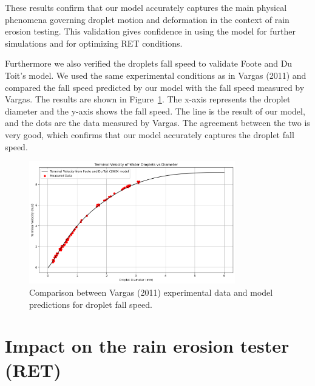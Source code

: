 \documentclass[10pt]{report}
\begin{document}
\par These results confirm that our model accurately captures the main physical phenomena governing droplet motion and deformation in the context of rain erosion testing. This validation gives confidence in using the model for further simulations and for optimizing RET conditions.
\vspace{5mm}
\par Furthermore we also verified the droplets fall speed to validate Foote and Du Toit's model. We used the same experimental conditions as in Vargas (2011) \cite{Vargas2010} and compared the fall speed predicted by our model with the fall speed measured by Vargas. The results are shown in Figure~\ref{fig:fall_speed_validation}. The x-axis represents the droplet diameter and the y-axis shows the fall speed. The line is the result of our model, and the dots are the data measured by Vargas. The agreement between the two is very good, which confirms that our model accurately captures the droplet fall speed.
\begin{figure}[H]
    \centering
    \includegraphics[width=0.8\textwidth]{figures/fall_speed_validation.png}
    \caption{Comparison between Vargas (2011) experimental data and model predictions for droplet fall speed.}
    \label{fig:fall_speed_validation}
\end{figure}

\section*{Impact on the rain erosion tester (RET)}
\end{document}
